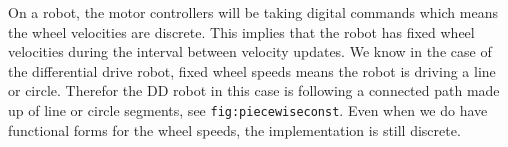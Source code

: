 \hypertarget{listcheckwheelspeed}{%
\label{listcheckwheelspeed}}%
\begin{Shaded}
\begin{Highlighting}[]
\NormalTok{xp[}\NormalTok{] }\OperatorTok{=} 
\NormalTok{yp[}\NormalTok{] }\OperatorTok{=} 
\NormalTok{th[}\NormalTok{] }\OperatorTok{=} 

\OperatorTok{=}\OperatorTok{:}\OperatorTok{{-}}
\NormalTok{    xp[i}\OperatorTok{+}\NormalTok{] }\OperatorTok{=}\OperatorTok{+}\OperatorTok{*}\OperatorTok{/}\NormalTok{)}\OperatorTok{*}\OperatorTok{+}\OperatorTok{*}
\NormalTok{    yp[i}\OperatorTok{+}\NormalTok{] }\OperatorTok{=}\OperatorTok{+}\OperatorTok{*}\OperatorTok{/}\NormalTok{)}\OperatorTok{*}\OperatorTok{+}\OperatorTok{*}
\NormalTok{    th[i}\OperatorTok{+}\NormalTok{] }\OperatorTok{=}\OperatorTok{+}\OperatorTok{*}\OperatorTok{/}\NormalTok{(}\OperatorTok{*}\OperatorTok{*}\OperatorTok{{-}}

\OperatorTok{,}\OperatorTok{,}\OperatorTok{=} \NormalTok{ )}
\OperatorTok{=}\OperatorTok{!}\OperatorTok{,}\OperatorTok{,}\OperatorTok{=}\OperatorTok{,}\OperatorTok{=} \NormalTok{)}















\end{Highlighting}
\end{Shaded}

On a robot, the motor controllers will be taking digital commands which
means the wheel velocities are discrete. This implies that the robot has
fixed wheel velocities during the interval between velocity updates. We
know in the case of the differential drive robot, fixed wheel speeds
means the robot is driving a line or circle. Therefor the DD robot in
this case is following a connected path made up of line or circle
segments, see \texttt{fig:piecewiseconst}. Even when we do have
functional forms for the wheel speeds, the implementation is still
discrete.

